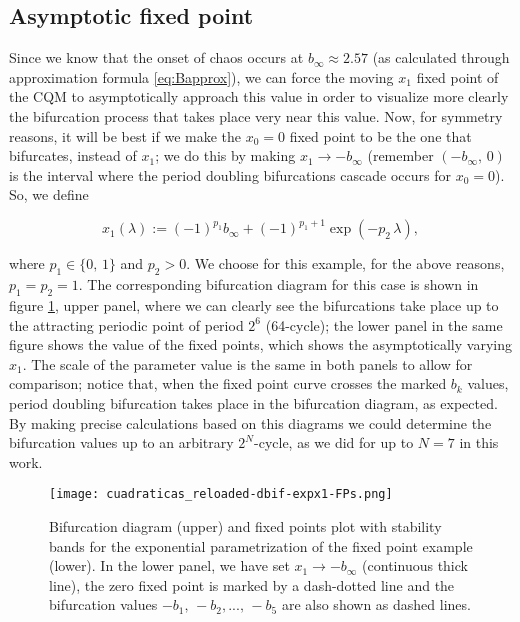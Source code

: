 \documentclass[10pt,twoside,titlepage]{book}
\numberwithin{equation}{chapter}
\numberwithin{figure}{chapter}
\numberwithin{table}{chapter}
\theoremstyle{plain}%
\theoremstyle{definition}
\theoremstyle{remark}
\begin{document}
\FloatBarrier

\subsection{Asymptotic fixed point}
\label{ex:expfp-CQM}

Since we know that the onset of chaos occurs at $b_{\infty}\approx 2.57$ (as calculated through approximation formula \ref{eq:Bapprox}), we can force the moving $x_1$ fixed point of the CQM to asymptotically approach this value in order to visualize more clearly the bifurcation process that takes place very near this value. Now, for symmetry reasons, it will be best if we make the $x_0=0$ fixed point to be the one that bifurcates, instead of $x_1$; we do this by making $x_1\rightarrow -b_{\infty}$ (remember $(-b_{\infty},\,0)$ is the interval where the period doubling bifurcations cascade occurs for $x_0=0$). So, we define

\begin{equation}
	x_1(\lambda):= (-1)^{p_1} b_{\infty} + (-1)^{p_1+1} \exp(-p_2\,\lambda),
	\label{eq:x1exp}
\end{equation}

where $p_1\in\{0,\,1\}$ and $p_2>0$. We choose for this example, for the above reasons, $p_1=p_2=1$.  The corresponding bifurcation diagram for this case is shown in figure \ref{fig:dbif_expx1_pdf-fps}, upper panel, where we can clearly see the bifurcations take place up to the attracting periodic point of period $2^6$ (64-cycle); the lower panel in the same figure shows the value of the fixed points, which shows the asymptotically varying $x_1$. The scale of the parameter value is the same in both panels to allow for comparison; notice that, when the fixed point curve crosses the marked $b_k$ values, period doubling bifurcation takes place in the bifurcation diagram, as expected. By making precise calculations based on this diagrams we could determine the bifurcation values up to an arbitrary $2^N$-cycle, as we did for up to $N=7$ in this work.

\begin{figure}
	\centering
	\texttt{[image: cuadraticas\_reloaded-dbif-expx1-FPs.png]}
	\caption{Bifurcation diagram (upper) and fixed points plot with stability bands for the exponential parametrization of the fixed point example (lower). In the lower panel, we have set $x_1\rightarrow -b_{\infty}$ (continuous thick line), the zero fixed point is marked by a dash-dotted line and the bifurcation values $-b_1,\,-b_2,...,\,-b_5$ are also shown as dashed lines.}
	\label{fig:dbif_expx1_pdf-fps}
\end{figure}
\end{document}
